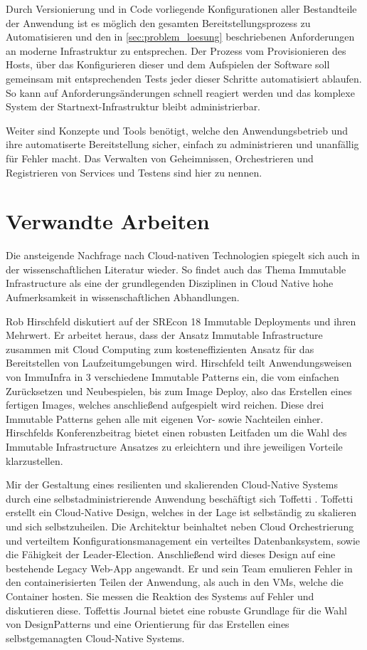 \documentclass[11pt]{scrartcl}
\begin{document}
Durch Versionierung und in Code vorliegende Konfigurationen aller Bestandteile der Anwendung ist es möglich den gesamten Bereitstellungsprozess zu Automatisieren und den in \cref{sec:problem_loesung} beschriebenen Anforderungen an moderne Infrastruktur zu entsprechen. Der Prozess vom Provisionieren des Hosts, über das Konfigurieren dieser und dem Aufspielen der Software soll gemeinsam mit entsprechenden Tests jeder dieser Schritte automatisiert ablaufen. So kann auf Anforderungsänderungen schnell reagiert
werden und das komplexe System der Startnext-Infrastruktur bleibt administrierbar.

Weiter sind Konzepte und Tools benötigt, welche den Anwendungsbetrieb und ihre automatiserte Bereitstellung
sicher, einfach zu administrieren und unanfällig für Fehler macht. Das Verwalten von Geheimnissen, Orchestrieren und Registrieren von Services und Testens sind hier zu nennen.

\section{Verwandte Arbeiten}

Die ansteigende Nachfrage nach Cloud-nativen Technologien spiegelt sich auch in der wissenschaftlichen Literatur wieder. So findet auch das Thema Immutable Infrastructure als eine der grundlegenden Disziplinen in Cloud Native hohe Aufmerksamkeit in wissenschaftlichen Abhandlungen.

Rob Hirschfeld \cite{Hirschfeld:2018} diskutiert auf der SREcon 18 Immutable Deployments und ihren Mehrwert. Er arbeitet heraus, dass der Ansatz Immutable Infrastructure zusammen mit Cloud Computing zum kosteneffizienten Ansatz für das Bereitstellen von Laufzeitumgebungen wird. Hirschfeld teilt Anwendungsweisen von ImmuInfra in 3 verschiedene Immutable Patterns ein, die vom einfachen Zurücksetzen und Neubespielen, bis zum Image Deploy, also das Erstellen eines fertigen Images, welches anschließend aufgespielt wird reichen. Diese drei Immutable Patterns gehen alle mit eigenen Vor- sowie Nachteilen einher. Hirschfelds Konferenzbeitrag bietet einen robusten Leitfaden um die Wahl des Immutable Infrastructure Ansatzes zu erleichtern und ihre jeweiligen Vorteile klarzustellen.

Mir der Gestaltung eines resilienten und skalierenden Cloud-Native Systems durch eine selbstadministrierende Anwendung beschäftigt sich Toffetti \cite{Toffetti:2017}. Toffetti erstellt ein Cloud-Native Design, welches in der Lage ist selbständig zu skalieren und sich selbstzuheilen. Die Architektur beinhaltet neben Cloud Orchestrierung und verteiltem Konfigurationsmanagement ein verteiltes Datenbanksystem, sowie die Fähigkeit der Leader-Election. Anschließend wird dieses Design auf eine bestehende Legacy Web-App angewandt. Er und sein Team emulieren Fehler in den containerisierten Teilen der Anwendung, als auch in den VMs, welche die Container hosten. Sie messen die Reaktion des Systems auf Fehler und diskutieren diese. Toffettis Journal bietet eine robuste Grundlage für die Wahl von DesignPatterns und eine Orientierung für das Erstellen eines selbstgemanagten Cloud-Native Systems.
\end{document}
